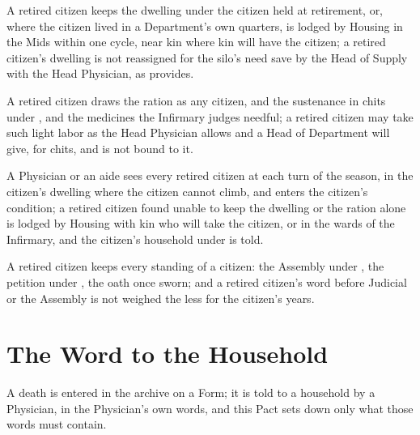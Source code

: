 \begin{clauses}
\item A retired citizen keeps the dwelling under  the citizen held at retirement, or, where the citizen lived in a Department's own quarters, is lodged by Housing in the Mids within one cycle, near kin where kin will have the citizen; a retired citizen's dwelling is not reassigned for the silo's need save by the Head of Supply with the Head Physician, as  provides.
\item A retired citizen draws the ration as any citizen, and the sustenance in chits under , and the medicines the Infirmary judges needful; a retired citizen may take such light labor as the Head Physician allows and a Head of Department will give, for chits, and is not bound to it.
\item A Physician or an aide sees every retired citizen at each turn of the season, in the citizen's dwelling where the citizen cannot climb, and enters the citizen's condition; a retired citizen found unable to keep the dwelling or the ration alone is lodged by Housing with kin who will take the citizen, or in the wards of the Infirmary, and the citizen's household under  is told.
\item A retired citizen keeps every standing of a citizen: the Assembly under , the petition under , the oath once sworn; and a retired citizen's word before Judicial or the Assembly is not weighed the less for the citizen's years.
\end{clauses}

\section{The Word to the Household}
\label{sec:health:word-to-the-household}

A death is entered in the archive on a Form; it is told to a household by a Physician, in the Physician's own words, and this Pact sets down only what those words must contain.


